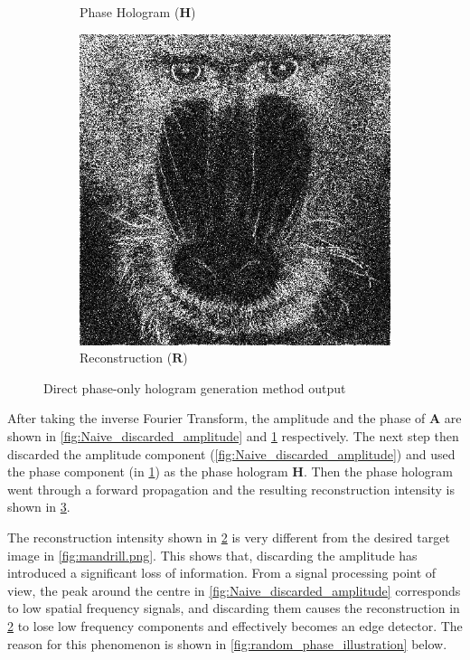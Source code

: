 \begin{figure}[H]
\begin{subfigure}[t]{0.3\textwidth}
    \caption{Phase Hologram ($\textbf{H}$)}
    \label{fig:Naive_output_holo}
  \end{subfigure}
  \hfill
  \begin{subfigure}[t]{0.3\textwidth}
    \centering
    \includegraphics[width=\textwidth]{Naive_output_recon.png}
    \caption{Reconstruction ($\textbf{R}$)}
    \label{fig:Naive_output_recon}
  \end{subfigure}
  \caption{Direct phase-only hologram generation method output}
  \label{fig:Naive algorithm output}
\end{figure}

After taking the inverse Fourier Transform, the amplitude and the phase of $\textbf{A}$ are shown in \cref{fig:Naive_discarded_amplitude} and \cref{fig:Naive_output_holo} respectively. The next step then discarded the amplitude component (\cref{fig:Naive_discarded_amplitude}) and used the phase component (in \cref{fig:Naive_output_holo}) as the phase hologram $\textbf{H}$. Then the phase hologram went through a forward propagation and the resulting reconstruction intensity is shown in \cref{fig:Naive algorithm output}.

The reconstruction intensity shown in \cref{fig:Naive_output_recon} is very different from the desired target image in \cref{fig:mandrill.png}. This shows that, discarding the amplitude has introduced a significant loss of information. From a signal processing point of view, the peak around the centre in \cref{fig:Naive_discarded_amplitude} corresponds to low spatial frequency signals, and discarding them causes the reconstruction in \cref{fig:Naive_output_recon} to lose low frequency components and effectively becomes an edge detector. The reason for this phenomenon is shown in \cref{fig:random_phase_illustration} below. 

